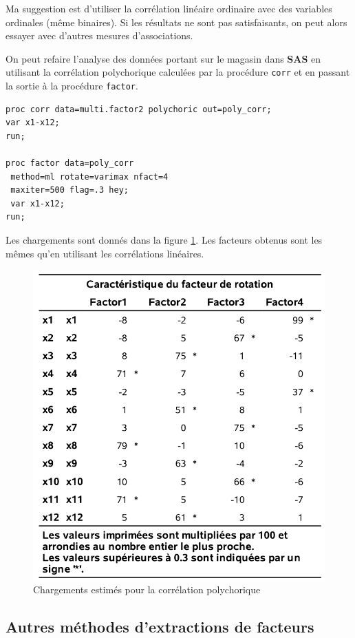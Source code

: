\documentclass[
]{book}
\theoremstyle{definition}
\theoremstyle{definition}
\theoremstyle{definition}
\theoremstyle{remark}
\begin{document}
Ma suggestion est d'utiliser la corrélation linéaire ordinaire avec des variables ordinales (même binaires). Si les résultats ne sont pas satisfaisants, on peut alors essayer avec d'autres mesures d'associations.

On peut refaire l'analyse des données portant sur le magasin dans \textbf{SAS} en utilisant la corrélation polychorique calculées par la procédure \texttt{corr} et en passant la sortie à la procédure \texttt{factor}.

\begin{verbatim}
proc corr data=multi.factor2 polychoric out=poly_corr;
var x1-x12;
run;

proc factor data=poly_corr
 method=ml rotate=varimax nfact=4
 maxiter=500 flag=.3 hey;
 var x1-x12;
run;
\end{verbatim}

Les chargements sont donnés dans la figure \ref{fig:fig1p12}. Les facteurs obtenus sont les mêmes qu'en utilisant les corrélations linéaires.

\begin{figure}

{\centering \includegraphics[width=0.65\linewidth]{figures/01-facto-e12} 

}

\caption{Chargements estimés pour la corrélation polychorique}\label{fig:fig1p12}
\end{figure}

\hypertarget{autres-muxe9thodes-dextractions-de-facteurs}{%
\subsection{Autres méthodes d'extractions de facteurs}\label{autres-muxe9thodes-dextractions-de-facteurs}}
\end{document}
